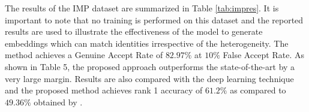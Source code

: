 \documentclass[10pt,twocolumn,letterpaper]{article}
\begin{document}
The results of the IMP dataset are summarized in Table \ref{tab:impres}. It is important to note that no training is performed on this dataset and the reported results are used to illustrate the effectiveness of the model to generate embeddings which can match identities irrespective of the heterogeneity. The method achieves a Genuine Accept Rate of $82.97\%$ at $10\%$ False Accept Rate. As shown in Table 5, the proposed approach  outperforms the state-of-the-art by a very large margin. Results are also compared with the deep learning technique \cite{schroff2015facenet} and the proposed method achieves rank 1 accuracy of $61.2\%$ as compared to $49.36\%$ obtained by \cite{schroff2015facenet}.


\begin{table}

\caption{Rank 1 accuracy on the VISOB Database for experiment 1 with all images.}
\vspace{-4pt}
\label{tab:visob_rank1}
\end{table}
\end{document}
